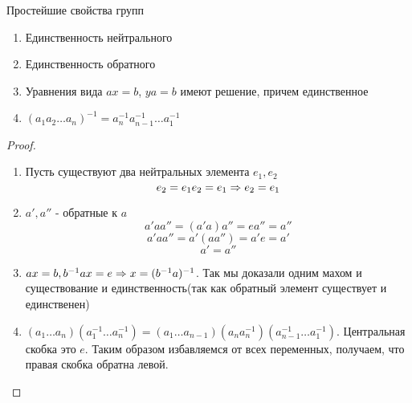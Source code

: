 \begin{theorem}{Простейшие свойства групп}
	\begin{enumerate}
		\item Единственность нейтрального
		\item Единственность обратного
		\item 
			Уравнения вида $ax=b$, $ya=b$ имеют решение, причем единственное
		\item $(a_1 a_2 \dots a_n)^{-1} = a_n^{-1} a_{n-1}^{-1} \dots a_1^{-1}$
   	\end{enumerate}
\end{theorem}
\begin{proof}
	\begin{enumerate}
		\item
			Пусть существуют два нейтральных элемента $e_1, e_2$
			$$e_2 = e_1 e_2 = e_1 \Rightarrow e_2 = e_1$$
		\item
			$a', a''$ - обратные к $a$
			$$a'aa'' = (a'a)a''= ea'' = a''$$
			$$a'aa'' = a'(aa'') = a'e = a'$$
			$$a' = a''$$
		\item
			$ax = b, b^{-1}ax = e \Rightarrow x = (b^{-1}a)^{-1}$.
			Так мы доказали одним махом и существование и единственность(так как обратный элемент существует и единственен)
		\item
			$(a_1 \dots a_n) (a_1^{-1} \dots a_n^{-1}) = (a_1 \dots a_{n-1})(a_n a_n^{-1})(a_{n-1}^{-1} \dots a_1^{-1})$.
			Центральная скобка это $e$. Таким образом избавляемся от всех переменных, получаем, что правая скобка обратна левой. 
	\end{enumerate}
\end{proof}
	
